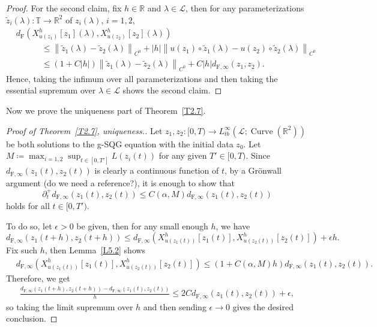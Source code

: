 \documentclass[reqno,centertags,12pt]{amsart}
\theoremstyle{definition}
\numberwithin{equation}{section}
\newcommand{\abs}[1]{\left\lvert#1\right\rvert}
\newcommand{\norm}[1]{\left\|#1\right\|}
\newcommand{\bbR}{{\mathbb{R}}}
\newcommand{\bbT}{{\mathbb{T}}}
\begin{document}
\begin{proof}
    For the second claim, fix $h\in\bbR$ and $\lambda\in\mathcal{L}$, then for any
    parameterizations $\tilde{z}_{i}(\lambda)\colon\bbT\to\bbR^{2}$
    of $z_{i}(\lambda)$, $i=1,2$,
    \begin{align*}
        & d_{\mathrm{F}}\left(
            X_{u(z_{1})}^{h}[z_{1}](\lambda),
            X_{u(z_{2})}^{h}[z_{2}](\lambda)
        \right)
        \\&\quad\quad\quad \leq
        \norm{\tilde{z}_{1}(\lambda) - \tilde{z}_{2}(\lambda)}_{C^{0}}
        + \abs{h}\norm{u(z_{1})\circ\tilde{z}_{1}(\lambda)
        - u(z_{2})\circ\tilde{z}_{2}(\lambda)}_{C^{0}}
        \\&\quad\quad\quad \leq
        \left(1 + C\abs{h}\right)
        \norm{\tilde{z}_{1}(\lambda) - \tilde{z}_{2}(\lambda)}_{C^{0}}
        + C\abs{h}d_{\mathrm{F},\infty}(z_{1}, z_{2}).
    \end{align*}
    Hence, taking the infimum over all parameterizations and then taking the
    essential supremum over $\lambda\in\mathcal{L}$ shows the second claim.
\end{proof}

Now we prove the uniqueness part of Theorem~\ref{T2.7}.

\begin{proof}[Proof of Theorem~\ref{T2.7}, uniqueness.]
    Let $z_{1},z_{2}\colon[0,T)\to
    L_{tb}^{\infty}(\mathcal{L};\operatorname{Curve}(\bbR^{2}))$ be both
    solutions to the g-SQG equation with the initial data $z_{0}$.
    Let $M\coloneqq \max_{i=1,2}\sup_{t\in [0,T']}L(z_{i}(t))$
    for any given $T'\in[0,T)$. Since $d_{\mathrm{F},\infty}(z_{1}(t),z_{2}(t))$
    is clearly a continuous function of $t$, by a Gr\"{o}nwall argument
    (do we need a reference?), it is enough to show that
    \[
        \partial_{t}^{+}d_{\mathrm{F},\infty}(z_{1}(t),z_{2}(t))
        \leq C(\alpha,M)d_{\mathrm{F},\infty}(z_{1}(t), z_{2}(t))
    \]
    holds for all $t\in[0,T')$.

    To do so, let $\epsilon>0$ be given, then for any small enough $h$, we have
    \[
        d_{\mathrm{F},\infty}(z_{1}(t+h), z_{2}(t+h))
        \leq d_{\mathrm{F},\infty}\left(
            X_{u(z_{1}(t))}^{h}[z_{1}(t)],
            X_{u(z_{2}(t))}^{h}[z_{2}(t)]
        \right) + \epsilon h.
    \]
    Fix such $h$, then Lemma~\ref{L5.2} shows
    \begin{align*}
        & d_{\mathrm{F},\infty}\left(
            X_{u(z_{1}(t))}^{h}[z_{1}(t)],
            X_{u(z_{2}(t))}^{h}[z_{2}(t)]
        \right)
        \leq \left(1 + C(\alpha,M)h\right)
        d_{\mathrm{F},\infty}(z_{1}(t), z_{2}(t)).
    \end{align*}
    Therefore, we get
    \begin{align*}
        \frac{d_{\mathrm{F},\infty}(z_{1}(t+h), z_{2}(t+h))
        - d_{\mathrm{F},\infty}(z_{1}(t), z_{2}(t))}{h}
        \leq 2Cd_{\mathrm{F},\infty}(z_{1}(t), z_{2}(t))
        + \epsilon,
    \end{align*}
    so taking the limit supremum over $h$ and then sending $\epsilon \to 0$
    gives the desired conclusion.
\end{proof}
\end{document}
